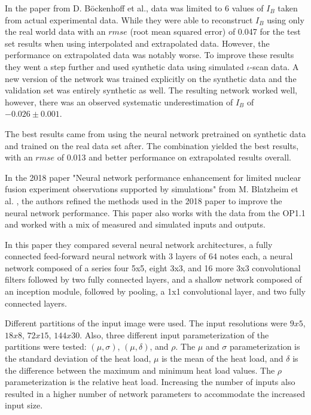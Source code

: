 In the paper from D. Böckenhoff et al., data was limited to 6 values of $I_B$ taken from actual experimental data. While they were able to reconstruct $I_B$ using only the real world data with an $rmse$ (root mean squared error) of 0.047 for the test set results when using interpolated and extrapolated data. However, the performance on extrapolated data was notably worse. To improve these results they went a step further and used synthetic data using simulated $\iota$-scan data. A new version of the network was trained explicitly on the synthetic data and the validation set was entirely synthetic as well. The resulting network worked well, however, there was an observed systematic underestimation of $I_B$ of $-0.026 \pm 0.001$.

The best results came from using the neural network pretrained on synthetic data and trained on the real data set after. The combination yielded the best results, with an $rmse$ of 0.013 and better performance on extrapolated results overall.

In the 2018 paper "Neural network performance enhancement for limited nuclear fusion experiment observations supported by simulations" from M. Blatzheim et al. \cite{Blatzheim_2018}, the authors refined the methods used in the 2018 paper to improve the neural network performance. This paper also works with the data from the OP1.1 and worked with a mix of measured and simulated inputs and outputs.

In this paper they compared several neural network architectures, a fully connected feed-forward neural network with 3 layers of 64 notes each, a neural network composed of a series four 5x5, eight 3x3, and 16 more 3x3 convolutional filters followed by two fully connected layers, and a shallow network composed of an inception module, followed by pooling, a 1x1 convolutional layer, and two fully connected layers.

Different partitions of the input image were used. The input resolutions were $9x5$, $18x8$, $72x15$, $144x30$. Also, three different input parameterization of the partitions were tested: $(\mu, \sigma)$, $(\mu, \delta)$, and $\rho$. The $\mu$ and $\sigma$ parameterization is the standard deviation of the heat load, $\mu$ is the mean of the heat load, and $\delta$ is the difference between the maximum and minimum heat load values. The $\rho$ parameterization is the relative heat load. Increasing the number of inputs also resulted in a higher number of network parameters to accommodate the increased input size.

